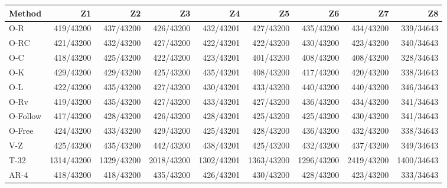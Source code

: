 \begin{tabular}{lrrrrrrrr}
\toprule
Method & Z1 & Z2 & Z3 & Z4 & Z5 & Z6 & Z7 & Z8 \\
\midrule
O-R & 419/43200 & 437/43200 & 426/43200 & 432/43201 & 427/43200 & 435/43200 & 434/43200 & 339/34643 \\
O-RC & 421/43200 & 432/43200 & 427/43200 & 422/43201 & 422/43200 & 430/43200 & 423/43200 & 340/34643 \\
O-C & 418/43200 & 425/43200 & 422/43200 & 423/43201 & 401/43200 & 408/43200 & 408/43200 & 328/34643 \\
O-K & 429/43200 & 429/43200 & 425/43200 & 435/43201 & 408/43200 & 417/43200 & 420/43200 & 338/34643 \\
O-L & 422/43200 & 435/43200 & 427/43200 & 430/43201 & 433/43200 & 440/43200 & 440/43200 & 346/34643 \\
O-Rv & 419/43200 & 435/43200 & 427/43200 & 433/43201 & 427/43200 & 436/43200 & 434/43200 & 341/34643 \\
O-Follow & 417/43200 & 428/43200 & 426/43200 & 428/43201 & 425/43200 & 425/43200 & 430/43200 & 341/34643 \\
O-Free & 424/43200 & 433/43200 & 429/43200 & 425/43201 & 428/43200 & 436/43200 & 432/43200 & 338/34643 \\
V-Z & 425/43200 & 435/43200 & 442/43200 & 438/43201 & 425/43200 & 432/43200 & 437/43200 & 349/34643 \\
T-32 & 1314/43200 & 1329/43200 & 2018/43200 & 1302/43201 & 1363/43200 & 1296/43200 & 2419/43200 & 1400/34643 \\
AR-4 & 418/43200 & 418/43200 & 435/43200 & 426/43201 & 430/43200 & 428/43200 & 423/43200 & 333/34643 \\
\bottomrule
\end{tabular}
